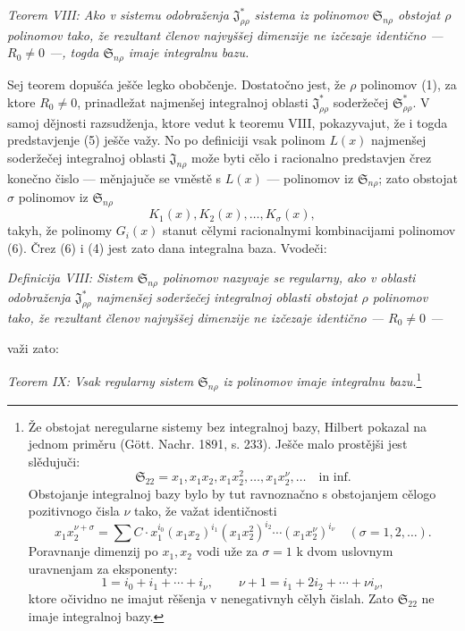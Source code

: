\documentclass[11pt]{article}
\providecommand{\Ssys}{\mathfrak{S}}
\providecommand{\Jdom}{\mathfrak{J}}
\begin{document}
{\itshape Teorem VIII: Ako v sistemu odobraženja $\Jdom^*_{\rho\rho}$ sistema iz polinomov $\Ssys_{n\rho}$ obstojat $\rho$ polinomov tako, že rezultant členov najvyššej dimenzije ne izčezaje identično --- $R_0\ne0$ ---, togda $\Ssys_{n\rho}$ imaje integralnu bazu.}

Sej teorem dopušća ješče legko obobčenje. Dostatočno jest, že $\rho$ polinomov (1), za ktore $R_0\ne0$, prinadležat najmenšej integralnoj oblasti $\Jdom^*_{\rho\rho}$ soderžečej $\Ssys^*_{\rho\rho}$. V samoj dějnosti razsudženja, ktore vedut k teoremu VIII, pokazyvajut, že i togda predstavjenje (5) ješče važy. No po definiciji vsak polinom $L(x)$ najmenšej soderžečej integralnoj oblasti $\Jdom_{n\rho}$ može byti cělo i racionalno predstavjen črez konečno čislo --- měnjajuče se vměstě s $L(x)$ --- polinomov iz $\Ssys_{n\rho}$; zato obstojat $\sigma$ polinomov iz $\Ssys_{n\rho}$
\begin{equation}
  K_1(x),K_2(x),\ldots,K_\sigma(x),
\tag{6}
\end{equation}
takyh, že polinomy $G_i(x)$ stanut cělymi racionalnymi kombinacijami polinomov (6). Črez (6) i (4) jest zato dana integralna baza. Vvodeči:

{\itshape Definicija VIII: Sistem $\Ssys_{n\rho}$ polinomov nazyvaje se regularny, ako v oblasti odobraženja $\Jdom^*_{\rho\rho}$ najmenšej soderžečej integralnoj oblasti obstojat $\rho$ polinomov tako, že rezultant členov najvyššej dimenzije ne izčezaje identično --- $R_0\ne0$ ---}

važi zato:

{\itshape Teorem IX: Vsak regularny sistem $\Ssys_{n\rho}$ iz polinomov imaje integralnu bazu.}\footnote{Že obstojat neregularne sistemy bez integralnoj bazy, Hilbert pokazal na jednom priměru (Gött. Nachr. 1891, s. 233). Ješče malo prostějši jest slědujuči:
\[
  \Ssys_{22}=x_1,
  x_1x_2,
  x_1x_2^2,
  \ldots,
  x_1x_2^\nu,
  \ldots\quad\text{in inf.}
\]
Obstojanje integralnoj bazy bylo by tut ravnoznačno s obstojanjem cělogo pozitivnogo čisla $\nu$ tako, že važat identičnosti
\[
  x_1x_2^{\nu+\sigma}=\sum C\cdot x_1^{i_0}(x_1x_2)^{i_1}(x_1x_2^2)^{i_2}\cdots(x_1x_2^\nu)^{i_\nu}
  \quad(\sigma=1,2,\ldots).
\]
Poravnanje dimenzij po $x_1,x_2$ vodi uže za $\sigma=1$ k dvom uslovnym uravnenjam za eksponenty:
\[
  1=i_0+i_1+\cdots+i_\nu,
  \qquad
  \nu+1=i_1+2i_2+\cdots+\nu i_\nu,
\]
ktore očividno ne imajut rěšenja v nenegativnyh cělyh čislah. Zato $\Ssys_{22}$ ne imaje integralnoj bazy.}
\end{document}

